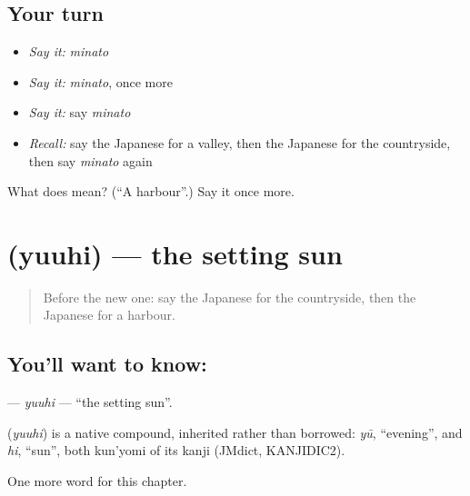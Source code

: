 \subsection*{Your turn}
\begin{itemize}
\raggedright
  \item \emph{Say it:} \emph{minato}
  \item \emph{Say it:} \emph{minato}, once more
  \item \emph{Say it:} say \emph{minato}
  \item \emph{Recall:} say the Japanese for a valley, then the Japanese for the countryside, then say \emph{minato} again
\end{itemize}

\begin{tcolorbox}[breakable,colback=teal!4,colframe=teal!35!black,title={Before you move on}]
What does  mean? (\textquotedblleft{}A harbour\textquotedblright{}.) Say it once more.
\end{tcolorbox}
\section[\texorpdfstring{\ja{ゆうひ} (yuuhi)}{ゆうひ (yuuhi)}]{ (yuuhi) — the setting sun}

\label{lesson:JA-C68-yuuhi}



\begin{quote}
Before the new one: say the Japanese for the countryside, then the Japanese for a harbour.
\end{quote}

\subsection*{You'll want to know: }
\textbf{} — \emph{yuuhi} — \textquotedblleft{}the setting sun\textquotedblright{}.

\begin{cousinweb}
\textbf{} (\emph{yuuhi}) is a native compound, inherited rather than borrowed: \emph{yū}, \textquotedblleft{}evening\textquotedblright{}, and \emph{hi}, \textquotedblleft{}sun\textquotedblright{}, both kun'yomi of its kanji (JMdict, KANJIDIC2).
\end{cousinweb}

\begin{grammarlens}[title={What you've built}]
One more word for this chapter.
\end{grammarlens}

